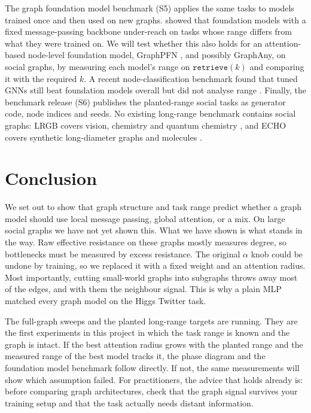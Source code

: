 The graph foundation model benchmark (S5) applies the same tasks to models trained once and then used on new graphs. \citet{f_gutteridge2026} showed that foundation models with a fixed message-passing backbone under-reach on tasks whose range differs from what they were trained on. We will test whether this also holds for an attention-based node-level foundation model, GraphPFN \citep{f_eremeev2026}, and possibly GraphAny, on social graphs, by measuring each model's range on $\texttt{retrieve}(k)$ and comparing it with the required $k$. A recent node-classification benchmark found that tuned GNNs still beat foundation models overall but did not analyse range \citep{f_lee2026}. Finally, the benchmark release (S6) publishes the planted-range social tasks as generator code, node indices and seeds. No existing long-range benchmark contains social graphs: LRGB covers vision, chemistry and quantum chemistry \citep{dwivedi2022}, and ECHO covers synthetic long-diameter graphs and molecules \citep{miglior2025}.

\section{Conclusion}
We set out to show that graph structure and task range predict whether a graph model should use local message passing, global attention, or a mix. On large social graphs we have not yet shown this. What we have shown is what stands in the way. Raw effective resistance on these graphs mostly measures degree, so bottlenecks must be measured by excess resistance. The original $\alpha$ knob could be undone by training, so we replaced it with a fixed weight and an attention radius. Most importantly, cutting small-world graphs into subgraphs throws away most of the edges, and with them the neighbour signal. This is why a plain MLP matched every graph model on the Higgs Twitter task.

The full-graph sweeps and the planted long-range targets are running. They are the first experiments in this project in which the task range is known and the graph is intact. If the best attention radius grows with the planted range and the measured range of the best model tracks it, the phase diagram and the foundation model benchmark follow directly. If not, the same measurements will show which assumption failed. For practitioners, the advice that holds already is: before comparing graph architectures, check that the graph signal survives your training setup and that the task actually needs distant information.
